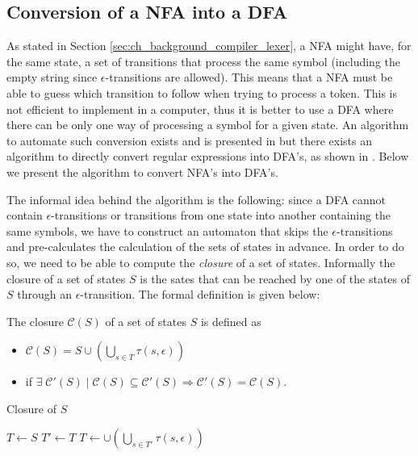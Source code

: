 \subsection{Conversion of a NFA into a DFA}
As stated in Section \ref{sec:ch_background_compiler_lexer}, a NFA might have, for the same state, a set of transitions that process the same symbol (including the empty string since $\epsilon$-transitions are allowed). This means that a NFA must be able to guess which transition to follow when trying to process a token. This is not efficient to implement in a computer, thus it is better to use a DFA where there can be only one way of processing a symbol for a given state. An algorithm to automate such conversion exists and is presented in \cite{aho2007compilers} but there exists an algorithm to directly convert regular expressions into DFA's, as shown in \cite{aho1986compilers}. Below we present the algorithm to convert NFA's into DFA's.

The informal idea behind the algorithm is the following: since a DFA cannot contain $\epsilon$-transitions or transitions from one state into another containing the same symbols, we have to construct an automaton that skips the $\epsilon$-transitions and pre-calculates the calculation of the sets of states in advance. In order to do so, we need to be able to compute the \textit{closure} of a set of states. Informally the closure of a set of states $S$ is the sates that can be reached by one of the states of $S$ through an $\epsilon$-transition. The formal definition is given below:

\begin{definition}
	The closure $\mathcal{C}(S)$ of a set of states $S$ is defined as
	\begin{itemize}[noitemsep]
		\item 
				$\displaystyle \mathcal{C}(S) = S \cup \left(\bigcup_{s \in T} \tau(s,\epsilon)	\right)$
		\item if $\exists \; \mathcal{C}'(S) \; | \; \mathcal{C}(S) \subseteq \mathcal{C}'(S) \Rightarrow \mathcal{C}'(S) = \mathcal{C}(S)$.
	\end{itemize}	
	
\end{definition}

\begin{algorithm}
	\caption{Closure of $S$}
	\label{alg:ch_background_closure}
	\begin{algorithmic}
		\State $T \gets S$
		\Repeat
			\State $T' \gets T$
			\State $T \gets \cup \left( \bigcup_{s \in  T'}\tau(s,\epsilon) \right)$
	\end{algorithmic}
\end{algorithm}

